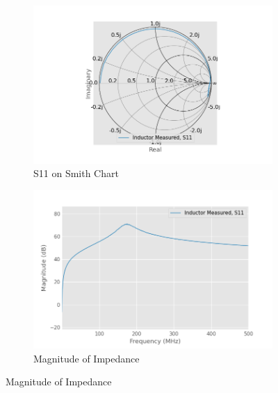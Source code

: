 \documentclass{article}
\begin{document}
\begin{figure}[h]
    \centering
    \begin{subfigure}{0.5\linewidth}
        \includegraphics[width=\linewidth]{./pics/inductor_meas_smith.png}
        \caption{S11 on Smith Chart}
    \end{subfigure}%
    \begin{subfigure}{0.5\linewidth}
        \includegraphics[width=\linewidth]{./pics/inductor_meas_db.png}
        \caption{Magnitude of Impedance}
    \end{subfigure}


\end{figure}
\end{document}
